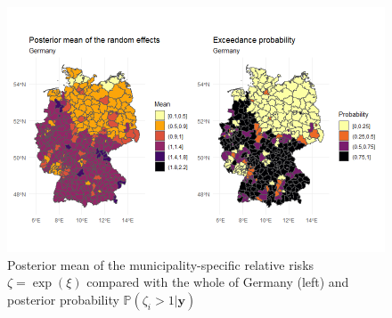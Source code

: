 \begin{figure}[H]
  \centering
  \includegraphics[width = \textwidth]{posterior_germany.png}
  \caption{Posterior mean of the municipality-specific relative risks $\zeta=\exp{\left(\xi\right)}$ compared with the whole of Germany (left) and posterior probability $\mathbb{P}\left(\zeta_i>1|\pmb{y}\right)$}
  \label{posterior_germany}
\end{figure}